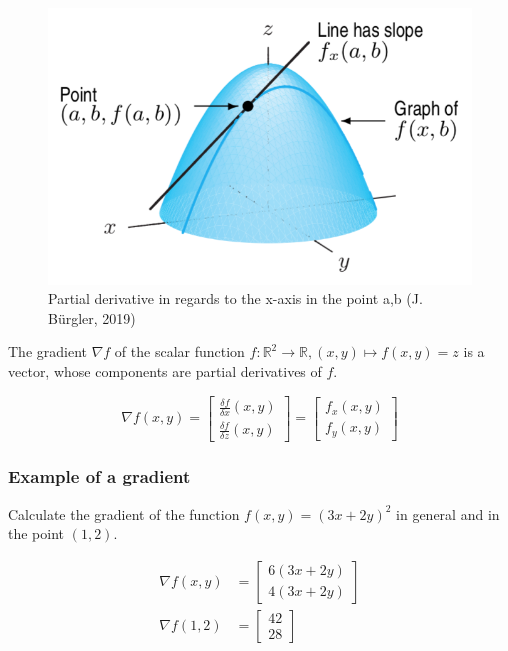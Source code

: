 \documentclass[11pt]{article}
\begin{document}
\begin{figure}[tbh!]
    \centering
    \includegraphics[keepaspectratio=true, width=0.8\linewidth]{Pictures/PartialDerivative}
    \caption{Partial derivative in regards to the x-axis in the point a,b (\textcopyright J. Bürgler, 2019)}
    \label{fig:partialderivative}
\end{figure}

The gradient $\nabla f$ of the scalar function $f: \mathbb{R}^2 \rightarrow \mathbb{R}, (x,y) \mapsto f(x,y) = z$ is a vector, whose components are partial derivatives of $f$.

\begin{equation}
    \nabla f(x,y) =
    \begin{bmatrix}
        \frac{\delta f}{\delta x}(x,y) \\
        \frac{\delta f}{\delta z}(x,y)
    \end{bmatrix}
    =
    \begin{bmatrix}
        f_x (x,y) \\
        f_y (x,y)
    \end{bmatrix}
\end{equation}

\subsubsection{Example of a gradient}

Calculate the gradient of the function $f(x,y) = (3x+2y)^2$ in general and in the point $(1,2)$.

\begin{align*}
    \nabla f(x,y) & = \begin{bmatrix}
        6(3x + 2y) \\
        4(3x + 2y)
    \end{bmatrix} \\
    \nabla f(1,2) & = \begin{bmatrix}
        42 \\
        28
    \end{bmatrix}
\end{align*}
\end{document}
